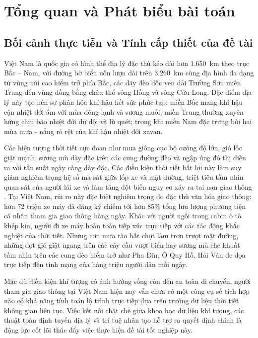 \chapter{Tổng quan và Phát biểu bài toán}
\label{ch:intro}

\section{Bối cảnh thực tiễn và Tính cấp thiết của đề tài}
Việt Nam là quốc gia có hình thể địa lý đặc thù kéo dài hơn 1.650~km theo trục Bắc -- Nam, với đường bờ biển uốn lượn dài trên 3.260~km cùng địa hình đa dạng từ vùng núi cao hiểm trở phía Bắc, các dãy đèo dốc ven dải Trường Sơn miền Trung đến vùng đồng bằng châu thổ sông Hồng và sông Cửu Long. Đặc điểm địa lý này tạo nên sự phân hóa khí hậu hết sức phức tạp: miền Bắc mang khí hậu cận nhiệt đới ẩm với mùa đông lạnh và sương muối; miền Trung thường xuyên hứng chịu bão nhiệt đới dữ dội và lũ quét; trong khi miền Nam đặc trưng bởi hai mùa mưa - nắng rõ rệt của khí hậu nhiệt đới xavan.

Các hiện tượng thời tiết cực đoan như mưa giông cục bộ cường độ lớn, gió lốc giật mạnh, sương mù dày đặc trên các cung đường đèo và ngập úng đô thị diễn ra với tần suất ngày càng dày đặc. Các điều kiện thời tiết bất lợi này làm suy giảm nghiêm trọng hệ số ma sát giữa lốp xe và mặt đường, triệt tiêu tầm nhìn quan sát của người lái xe và làm tăng đột biến nguy cơ xảy ra tai nạn giao thông \cite{andrey2003weather}. Tại Việt Nam, rủi ro này đặc biệt nghiêm trọng do đặc thù văn hóa giao thông: hơn 72 triệu xe máy đã đăng ký chiếm tới hơn 85\% tổng lưu lượng phương tiện cá nhân tham gia giao thông hàng ngày. Khác với người ngồi trong cabin ô tô khép kín, người đi xe máy hoàn toàn tiếp xúc trực tiếp với các tác động khắc nghiệt của thời tiết. Những cơn mưa rào bất chợt làm trơn trượt mặt đường, những đợt gió giật ngang trên các cây cầu vượt biển hay sương mù che khuất tầm nhìn trên các cung đèo hiểm trở như Pha Đin, Ô Quy Hồ, Hải Vân đe dọa trực tiếp đến tính mạng của hàng triệu người dân mỗi ngày.

Mặc dù điều kiện khí tượng có ảnh hưởng sống còn đến an toàn di chuyển, người tham gia giao thông tại Việt Nam hiện nay vẫn chưa có một công cụ số tích hợp nào có khả năng tính toán lộ trình trực tiếp dựa trên trường dữ liệu thời tiết không gian liên tục. Việc kết nối chặt chẽ giữa khoa học dữ liệu khí tượng, các thuật toán định tuyến địa lý và trí tuệ nhân tạo hỗ trợ ra quyết định chính là động lực cốt lõi thúc đẩy việc thực hiện đề tài tốt nghiệp này.

